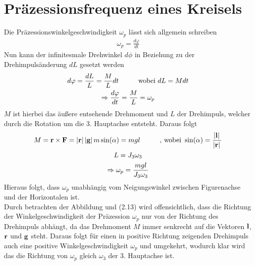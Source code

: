 

\section{Präzessionsfrequenz eines Kreisels}
Die Präzessionswinkelgeschwindigkeit $\omega_p$ lässt sich allgemein schreiben 
\begin{align}
    \omega_p = \frac{d\varphi}{dt}
\end{align}
Nun kann der infinitesmale Drehwinkel $d\phi$ in Beziehung zu der Drehimpulsänderung $dL$ gesetzt werden
\begin{gather}
    d\varphi = \frac{dL}{L} = \frac{M}{L} dt \hspace*{1cm}\text{wobei } dL = M dt \\
    \Rightarrow \frac{d\varphi}{dt} = \frac{M}{L} = \omega_p
\end{gather}
$M$ ist hierbei das äußere entsehende Drehmoment und $L$ der Drehimpuls, welcher durch die Rotation um die 3. Hauptachse entsteht. Daraus folgt
\begin{gather}
    M = \boldsymbol{\mathbf{r}} \times \boldsymbol{\mathbf{F}} = \abs*{\boldsymbol{\mathbf{r}}}\abs*{\boldsymbol{\mathbf{g}}}m\sin(\alpha) = mgl \hspace*{1cm}\text{, wobei }\sin(\alpha)=\frac{\abs*{\boldsymbol{\mathbf{l}}}}{\abs*{\boldsymbol{\mathbf{r}}}}\\
    L = J_3\omega_3\\
    \Rightarrow \omega_p = \frac{mgl}{J_3\omega_3}
\end{gather}
Hieraus folgt, dass $\omega_p$ unabhängig vom Neigungswinkel zwischen Figurenachse und der Horizontalen ist.\\
Durch betrachten der Abbildung und (2.13) wird offensichtlich, dass die Richtung der Winkelgeschwindigkeit der Präzession $\omega_p$ nur von der Richtung des Drehimpuls abhängt, da das Drehmoment $M$ immer senkrecht auf die Vektoren $\boldsymbol{\mathbf{l}}$,$\boldsymbol{\mathbf{r}}$ und $\boldsymbol{\mathbf{g}}$ steht. Daraus folgt für einen in positive Richtung zeigenden Drehimpuls auch eine positive Winkelgeschwindigkeit $\omega_p$ und umgekehrt, wodurch klar wird das die Richtung von $\omega_p$ gleich $\omega_3$ der 3. Hauptachse ist.